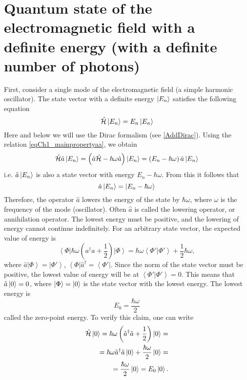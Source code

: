 \section{Quantum state of the electromagnetic field with a definite
  energy (with a definite number of photons)}
First, consider a single mode of the electromagnetic field (a simple
harmonic oscillator). The state vector with a definite energy
$\ket{E_n}$ satisfies the following equation
\begin{equation}
\hat{\mathcal{H}} \ket{E_n} = E_n \ket{E_n}
\end{equation}
Here and below we will use the Dirac formalism (see 
\autoref{AddDirac}). Using the relation \eqref{eqCh1_mainpropertyaa},
we obtain 
\begin{equation}
\hat{\mathcal{H}} \hat{a}\ket{E_n} = 
\left(\hat{a}\hat{\mathcal{H}} -
\hbar\omega\hat{a}\right)\ket{E_n} =
\left(E_n - \hbar \omega\right)\hat{a}\ket{E_n}
\end{equation}
i.e. $\hat{a}\ket{E_n}$ is also a state vector with
energy $E_n - \hbar \omega$. From this it follows that
\[
\hat{a}\ket{E_n} = \left|E_n - \hbar \omega \right>
\] 
Therefore, the operator $\hat{a}$ lowers the energy of the state by $\hbar
\omega$,  where $\omega$ is the frequency of the mode (oscillator). Often $\hat{a}$
is called the lowering operator, or annihilation operator. The lowest
energy must be positive, and the lowering of energy cannot
continue indefinitely. For an arbitrary state vector,
the expected value of energy is
\begin{equation}
\left< \Phi \right| \hbar \omega \left({a}^{\dag} {a}  +
\frac{1}{2}\right)\left| \Phi \right> = 
\hbar \omega \left< \Phi' \right. \left| \Phi' \right> + \frac{1}{2}
\hbar \omega,
\end{equation}
where  $\hat{a} \left| \Phi \right> = \left| \Phi' \right>$,  
$\left< \Phi \right| \hat{a}^{\dag}  = \left< \Phi' \right|$.  Since
the norm of the state vector must be positive, 
the lowest value of energy will be at  
\(
\left< \Phi' \right. \left| \Phi' \right> = 0.
\)
This means that $\hat{a}\ket{0} = 0$,  where
$\left|\Phi\right> = \ket{0}$ is the state vector with the lowest
energy. The lowest energy is  
\begin{equation}
E_0 = \frac{\hbar \omega}{2}
\end{equation}
called the zero-point energy. To verify this claim,
one can write
\begin{eqnarray}
\hat{\mathcal{H}} \ket{0} = 
\hbar \omega \left(\hat{a}^{\dag} \hat{a} +
\frac{1}{2}\right) \ket{0} = 
\nonumber \\
= 
\hbar \omega \hat{a}^{\dag} \hat{a} \ket{0} +
\frac{\hbar \omega}{2}\ket{0} =
\nonumber \\
= \frac{\hbar \omega}{2} \ket{0} = 
E_0 \ket{0}.
\label{eqProper0state}
\end{eqnarray}


